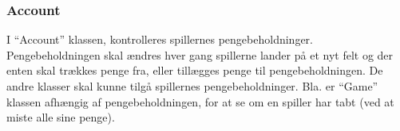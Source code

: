 \subsubsection{Account}
I “Account” klassen, kontrolleres spillernes pengebeholdninger. Pengebeholdningen skal ændres hver gang spillerne lander på et nyt felt og der enten skal trækkes penge fra, eller tillægges penge til pengebeholdningen. De andre klasser skal kunne tilgå spillernes pengebeholdninger. Bla. er “Game” klassen afhængig af pengebeholdningen, for at se om en spiller har tabt (ved at miste alle sine penge).